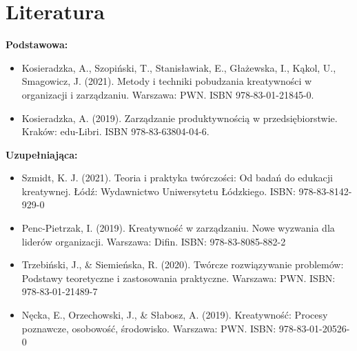 \documentclass[12pt, a4paper]{article}
\begin{document}
\section{Literatura}

\textbf{Podstawowa:}
\begin{itemize}
  \item Kosieradzka, A., Szopiński, T., Stanisławiak, E., Głażewska, I., Kąkol, U., Smagowicz, J. (2021). Metody i techniki pobudzania kreatywności w organizacji i zarządzaniu. Warszawa: PWN. ISBN 978-83-01-21845-0.
  \item Kosieradzka, A. (2019). Zarządzanie produktywnością w przedsiębiorstwie. Kraków: edu-Libri. ISBN 978-83-63804-04-6.
\end{itemize}

\textbf{Uzupełniająca:}
\begin{itemize}
  \item Szmidt, K. J. (2021). Teoria i praktyka twórczości: Od badań do edukacji kreatywnej. Łódź: Wydawnictwo Uniwersytetu Łódzkiego. ISBN: 978-83-8142-929-0
  \item Penc-Pietrzak, I. (2019). Kreatywność w zarządzaniu. Nowe wyzwania dla liderów organizacji. Warszawa: Difin. ISBN: 978-83-8085-882-2
  \item Trzebiński, J., \& Siemieńska, R. (2020). Twórcze rozwiązywanie problemów: Podstawy teoretyczne i zastosowania praktyczne. Warszawa: PWN. ISBN: 978-83-01-21489-7
  \item Nęcka, E., Orzechowski, J., \& Słabosz, A. (2019). Kreatywność: Procesy poznawcze, osobowość, środowisko. Warszawa: PWN. ISBN: 978-83-01-20526-0
\end{itemize}
\end{document}
